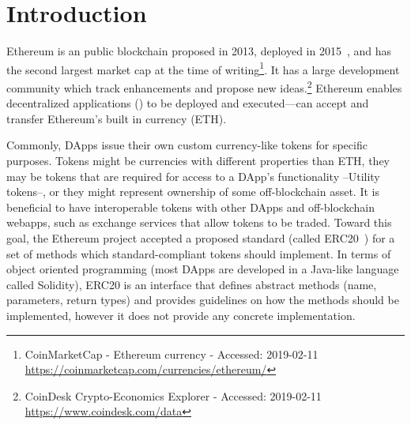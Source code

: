 
\section{Introduction}



Ethereum is an public blockchain proposed in 2013, deployed in 2015~\cite{Ref00}, and has the second largest market cap at the time of writing\footnote{CoinMarketCap - Ethereum currency - Accessed: 2019-02-11 \newline\url{https://coinmarketcap.com/currencies/ethereum/}}. It has a large development community which track enhancements and propose new ideas.\footnote{CoinDesk Crypto-Economics Explorer - Accessed: 2019-02-11 \newline\url{https://www.coindesk.com/data}} Ethereum enables decentralized applications (\dapps) to be deployed and executed---\dapps can accept and transfer Ethereum's built in currency (ETH). 

Commonly, DApps issue their own custom currency-like tokens for specific purposes. Tokens might be currencies with different properties than ETH, they may be tokens that are required for access to a DApp's functionality --Utility tokens--, or they might represent ownership of some off-blockchain asset. It is beneficial to have interoperable tokens with other DApps and off-blockchain webapps, such as exchange services that allow tokens to be traded. Toward this goal, the Ethereum project accepted a proposed standard (called ERC20~\cite{Ref08}) for a set of methods which standard-compliant tokens should implement. In terms of object oriented programming (most DApps are developed in a Java-like language called Solidity), ERC20 is an interface that defines abstract methods (name, parameters, return types) and provides guidelines on how the methods should be implemented, however it does not provide any concrete implementation. 



